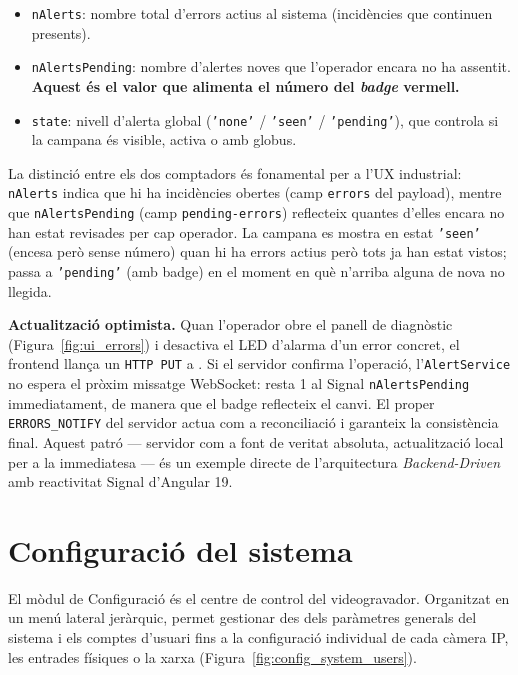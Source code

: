 \begin{itemize}
  \item \texttt{nAlerts}: nombre total d'errors actius al sistema (incidències que continuen presents).
  \item \texttt{nAlertsPending}: nombre d'alertes noves que l'operador encara no ha assentit. \textbf{Aquest és el valor que alimenta el número del \textit{badge} vermell.}
  \item \texttt{state}: nivell d'alerta global (\texttt{'none'} / \texttt{'seen'} / \texttt{'pending'}), que controla si la campana és visible, activa o amb globus.
\end{itemize}

La distinció entre els dos comptadors és fonamental per a l'UX industrial: \texttt{nAlerts} indica que hi ha incidències obertes (camp \texttt{errors} del payload), mentre que \texttt{nAlertsPending} (camp \texttt{pending-errors}) reflecteix quantes d'elles encara no han estat revisades per cap operador. La campana es mostra en estat \texttt{'seen'} (encesa però sense número) quan hi ha errors actius però tots ja han estat vistos; passa a \texttt{'pending'} (amb badge) en el moment en què n'arriba alguna de nova no llegida.

\textbf{Actualització optimista.} Quan l'operador obre el panell de diagnòstic (Figura~\ref{fig:ui_errors}) i desactiva el LED d'alarma d'un error concret, el frontend llança un \texttt{HTTP PUT} a . Si el servidor confirma l'operació, l'\texttt{AlertService} no espera el pròxim missatge WebSocket: resta 1 al Signal \texttt{nAlertsPending} immediatament, de manera que el badge reflecteix el canvi. El proper \texttt{ERRORS\_NOTIFY} del servidor actua com a reconciliació i garanteix la consistència final. Aquest patró — servidor com a font de veritat absoluta, actualització local per a la immediatesa — és un exemple directe de l'arquitectura \textit{Backend-Driven} amb reactivitat Signal d'Angular 19.

\section{Configuració del sistema}
El mòdul de Configuració és el centre de control del videogravador. Organitzat en un menú lateral jeràrquic, permet gestionar des dels paràmetres generals del sistema i els comptes d'usuari fins a la configuració individual de cada càmera IP, les entrades físiques o la xarxa (Figura~\ref{fig:config_system_users}).

